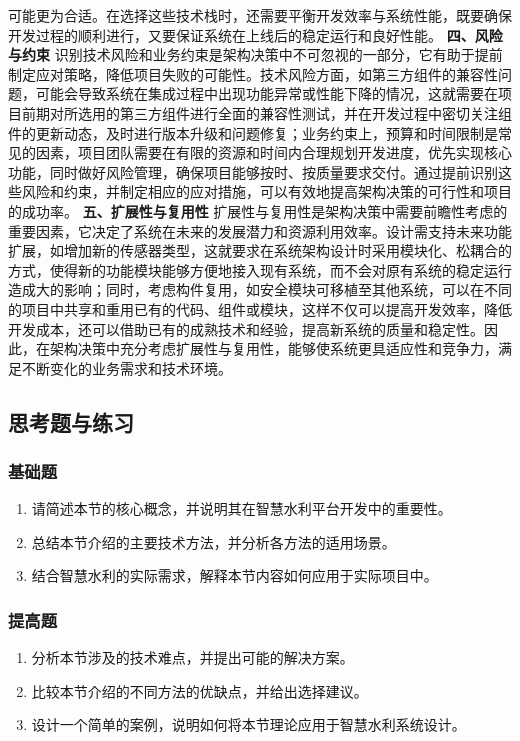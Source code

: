 可能更为合适。在选择这些技术栈时，还需要平衡开发效率与系统性能，既要确保开发过程的顺利进行，又要保证系统在上线后的稳定运行和良好性能。 \textbf{四、风险与约束}
识别技术风险和业务约束是架构决策中不可忽视的一部分，它有助于提前制定应对策略，降低项目失败的可能性。技术风险方面，如第三方组件的兼容性问题，可能会导致系统在集成过程中出现功能异常或性能下降的情况，这就需要在项目前期对所选用的第三方组件进行全面的兼容性测试，并在开发过程中密切关注组件的更新动态，及时进行版本升级和问题修复；业务约束上，预算和时间限制是常见的因素，项目团队需要在有限的资源和时间内合理规划开发进度，优先实现核心功能，同时做好风险管理，确保项目能够按时、按质量要求交付。通过提前识别这些风险和约束，并制定相应的应对措施，可以有效地提高架构决策的可行性和项目的成功率。
\textbf{五、扩展性与复用性}
扩展性与复用性是架构决策中需要前瞻性考虑的重要因素，它决定了系统在未来的发展潜力和资源利用效率。设计需支持未来功能扩展，如增加新的传感器类型，这就要求在系统架构设计时采用模块化、松耦合的方式，使得新的功能模块能够方便地接入现有系统，而不会对原有系统的稳定运行造成大的影响；同时，考虑构件复用，如安全模块可移植至其他系统，可以在不同的项目中共享和重用已有的代码、组件或模块，这样不仅可以提高开发效率，降低开发成本，还可以借助已有的成熟技术和经验，提高新系统的质量和稳定性。因此，在架构决策中充分考虑扩展性与复用性，能够使系统更具适应性和竞争力，满足不断变化的业务需求和技术环境。
\subsection{思考题与练习}\label{ux601dux8003ux9898ux4e0eux7ec3ux4e60} \subsubsection{基础题}\label{ux57faux7840ux9898}
\begin{enumerate} \def\labelenumi{\arabic{enumi}.} \tightlist \item 请简述本节的核心概念，并说明其在智慧水利平台开发中的重要性。 \item
总结本节介绍的主要技术方法，并分析各方法的适用场景。 \item 结合智慧水利的实际需求，解释本节内容如何应用于实际项目中。 \end{enumerate}
\subsubsection{提高题}\label{ux63d0ux9ad8ux9898} \begin{enumerate} \def\labelenumi{\arabic{enumi}.} \tightlist \item
分析本节涉及的技术难点，并提出可能的解决方案。 \item 比较本节介绍的不同方法的优缺点，并给出选择建议。 \item 设计一个简单的案例，说明如何将本节理论应用于智慧水利系统设计。 \end{enumerate}
